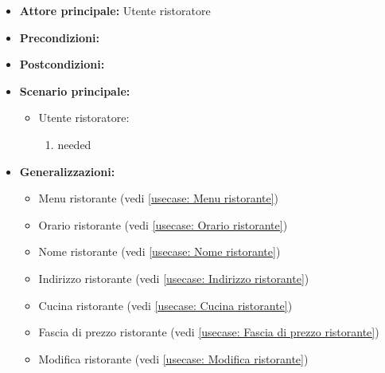 \label{usecase:Profilo ristorante}
\begin{itemize}
\item \textbf{Attore principale:}  Utente ristoratore
\item \textbf{Precondizioni:}
\item \textbf{Postcondizioni:}
\item \textbf{Scenario principale:}
\begin{itemize}
\item  Utente ristoratore:
\begin{enumerate}
\item needed
\end{enumerate}
\end{itemize}
\item \textbf{Generalizzazioni:}
\begin{itemize}
\item  Menu ristorante (vedi \autoref{usecase: Menu ristorante})
\item  Orario ristorante (vedi \autoref{usecase: Orario ristorante})
\item  Nome ristorante (vedi \autoref{usecase: Nome ristorante})
\item  Indirizzo ristorante (vedi \autoref{usecase: Indirizzo ristorante})
\item  Cucina ristorante (vedi \autoref{usecase: Cucina ristorante})
\item  Fascia di prezzo ristorante (vedi \autoref{usecase: Fascia di prezzo ristorante})
\item  Modifica ristorante (vedi \autoref{usecase: Modifica ristorante})
\end{itemize}
\end{itemize}